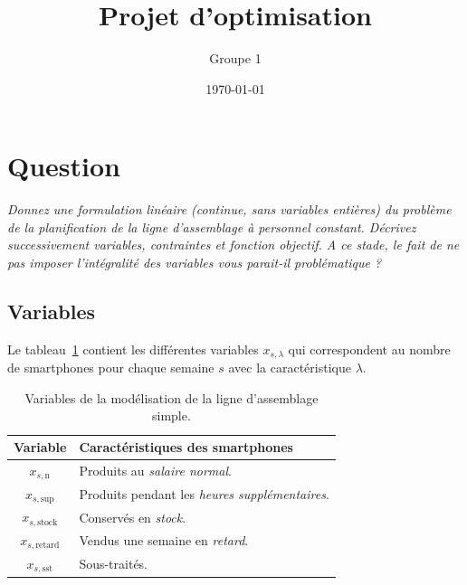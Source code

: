 \documentclass[12pt,oneside,a4paper]{article}
\title{Projet d'optimisation}
\author{Groupe 1}
\date{\today}
\newcommand{\question}
{
\addtocounter{section}{1}
\section*{Question \thesection}
}
\newcommand{\myX}[2]{x_{#1,\text{#2}}}
\newcommand{\xSemaine}[1]{\myX{s}{#1}}
\newcommand{\xn}{\xSemaine{n}}
\newcommand{\xsup}{\xSemaine{sup}}
\newcommand{\xstock}{\xSemaine{stock}}
\newcommand{\xretard}{\xSemaine{retard}}
\newcommand{\xsst}{\xSemaine{sst}}
\begin{document}
\maketitle

\question %
\emph{Donnez une formulation linéaire (continue, sans variables entières) 
du problème de la planification de la ligne d'assemblage à personnel constant.
Décrivez successivement variables, contraintes et fonction objectif. 
A ce stade, le fait de ne pas imposer l'intégralité des variables 
vous parait-il problématique ?}

\subsection*{Variables}
Le tableau~\ref{tab:variablesQuestion1} contient les différentes variables $x_{s,\lambda}$
qui correspondent au nombre de smartphones pour chaque semaine $s$
avec la caractéristique $\lambda$.

\begin{table}[h]
  \begin{center}
  \begin{tabular}{|c|l|}
    \hline
    Variable & Caractéristiques des smartphones \\
    \hline
    \hline
    $\xn$ & Produits au \emph{salaire normal}. \\
    \hline
    $\xsup$ & Produits pendant les \emph{heures supplémentaires}. \\
    \hline
    $\xstock$ & Conservés en \emph{stock}. \\
    \hline
    $\xretard$ & Vendus une semaine en \emph{retard}. \\
    \hline
    $\xsst$ & Sous-traités. \\
    \hline
  \end{tabular}
  \caption{Variables de la modélisation de la ligne d'assemblage simple.}
  \label{tab:variablesQuestion1}
  \end{center}
\end{table}
\end{document}

